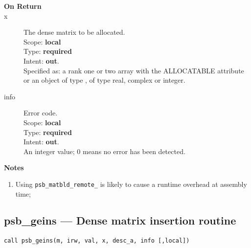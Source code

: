 \begin{description}
\item[\bf On Return]
\item[x] The dense matrix to be allocated.\\
Scope: {\bf local} \\
Type: {\bf required}\\
Intent: {\bf out}.\\
Specified as: a rank one or two array with the ALLOCATABLE  attribute
or an object of type \vdata, of type real, complex or integer.\\ 
\item[info] Error code.\\
Scope: {\bf local} \\
Type: {\bf required} \\
Intent: {\bf out}.\\
An integer value; 0 means no error has been detected. 
\end{description}

{\par\noindent\large\bfseries Notes}
\begin{enumerate}
\item Using \verb|psb_matbld_remote_| is likely to cause  a runtime  overhead at
  assembly time;
\end{enumerate}

%
%
\clearpage\subsection{psb\_geins --- Dense matrix insertion routine}

\begin{verbatim}
call psb_geins(m, irw, val, x, desc_a, info [,local])
\end{verbatim}

